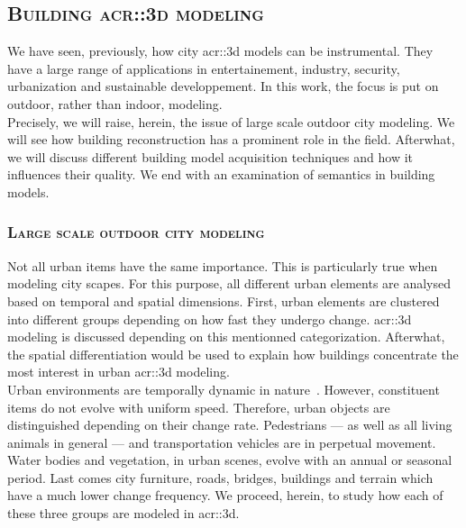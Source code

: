     \subsection{\textsc{Building \texorpdfstring{\gls*{acr::3d}}{3D} modeling}}
        \label{subsec::introduction::urban_3d_reconstruction::building_3d_modeling}
        We have seen, previously, how city \gls{acr::3d} models can be instrumental.
        They have a large range of applications in entertainement, industry, security, urbanization and sustainable developpement.
        In this work, the focus is put on outdoor, rather than indoor, modeling.\\
        Precisely, we will raise, herein, the issue of large scale outdoor city modeling.
        We will see how building reconstruction has a prominent role in the field.
        Afterwhat, we will discuss different building model acquisition techniques and how it influences their quality.
        We end with an examination of semantics in building models.

        \subsubsection{\textsc{Large scale outdoor city modeling}}
            Not all urban items have the same importance.
            This is particularly true when modeling city scapes.
            For this purpose, all different urban elements are analysed based on temporal and spatial dimensions.
            First, urban elements are clustered into different groups depending on how fast they undergo change.
            \gls{acr::3d} modeling is discussed depending on this mentionned categorization.
            Afterwhat, the spatial differentiation would be used to explain how buildings concentrate the most interest in urban \gls{acr::3d} modeling.\\

            Urban environments are temporally dynamic in nature~\parencite{vanhoey2017varcity}.
            However, constituent items do not evolve with uniform speed.
            Therefore, urban objects are distinguished depending on their change rate.
            Pedestrians --- as well as all living animals in general --- and transportation vehicles are in perpetual movement.
            Water bodies and vegetation, in urban scenes, evolve with an annual or seasonal period.
            Last comes city furniture, roads, bridges, buildings and terrain which have a much lower change frequency.
            We proceed, herein, to study how each of these three groups are modeled in \gls{acr::3d}.\\

